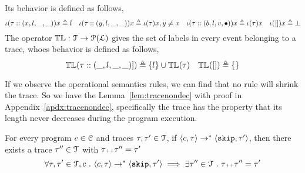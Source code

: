 Its behavior is defined as follows,
  \[
  \iota(\mathtt{\tau}  :: (x, l, \_, \_)) x \triangleq l
  ~~~
  \iota(\mathtt{\tau}  :: (y, l, \_, \_)) x \triangleq \iota(\mathtt{\tau} ) x, y \neq x
  ~~~
  \iota(\mathtt{\tau} :: (b, l, v, \bullet)) x \triangleq \iota(\mathtt{\tau}) x
  ~~~
  \iota({[]}) x \triangleq \bot
  \]
%
  The operator $\mathbb{TL} : \mathcal{T} \to \mathcal{P}{(\mathcal{L})}$ gives the set of labels in every event belonging to 
  a trace, whoes behavior is defined as follows,
\[
\mathbb{TL}{(\mathtt{\tau}  :: (\_, l, \_, \_)])} \triangleq \{l\} \cup \mathbb{TL}{(\mathtt{\tau} )}
~~~
\mathbb{TL}({[ ]}) \triangleq \{\}
\]

If we observe the operational semantics rules, we can find that no rule will shrink the trace. 
So we have the Lemma~\ref{lem:tracenondec} with proof in Appendix~\ref{apdx:tracenondec}, 
specifically the trace has the property that its length never decreases during the program execution.
\begin{lem}
\label{lem:tracenondec}
For every program $c \in \mathcal{C}$ and traces $\mathtt{\tau}, \mathtt{\tau}' \in \mathcal{T}$, if 
$\langle c, \mathtt{\tau} \rangle \rightarrow^{*} \langle \mathtt{skip}, \mathtt{\tau}' \rangle$,
then there exists a trace $\mathtt{\tau}'' \in \mathcal{T}$ with $\mathtt{\tau} {\scriptscriptstyle ++} \mathtt{\tau}'' = \mathtt{\tau}'$
%
$$
\forall \mathtt{\tau}, \mathtt{\tau}' \in \mathcal{T}, c ~.~
\langle c, \mathtt{\tau} \rangle \rightarrow^{*} \langle \mathtt{skip}, \mathtt{\tau}' \rangle 
\implies \exists \mathtt{\tau}'' \in \mathcal{T} ~.~ \mathtt{\tau} {\scriptscriptstyle ++} \mathtt{\tau}'' = \mathtt{\tau}'
$$
\end{lem}

